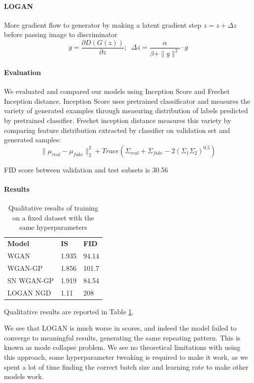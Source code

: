 \documentclass{article}
\begin{document}
	\paragraph {LOGAN} \cite{wu2020logan} More gradient flow to generator by making a latent gradient step $z = z + \Delta z$ before passing image to discriminator
	$$g = \frac{\partial D(G(z))}{\partial z}; \; \; \Delta z = \frac {\alpha} {\beta + \| g \|^2} \cdot g$$
	
	\paragraph{Evaluation}
	We evaluated and compared our models using Inception Score and Frechet Inception distance. Inception Score uses pretrained classificator and measures the variety of generated examples through measuring distribution of labels predicted by pretrained classifier. Frechet inception distance measures this variety by comparing feature distribution extracted by classifier on validation set and generated samples:
	$$\| \mu_{real} - \mu_{fake} \|_2^2 + Trace(\Sigma_{real} + \Sigma_{fake} - 2 (\Sigma_1 \Sigma_2)^{0.5})$$
	
	FID score between validation and test subsets is 30.56
	
	\paragraph{Results}
		\begin{table}[]
		\centering
		\begin{tabular}{lll}
			\textbf{Model} & \textbf{IS} & \textbf{FID} \\
			WGAN           & 1.935       & 94.14        \\
			WGAN-GP        & 1.856       & 101.7        \\
			SN WGAN-GP     & 1.919       & 84.54        \\
			LOGAN NGD      & 1.11        & 208         
		\end{tabular}
		\caption{Qualitative results of training on a fixed dataset with the same hyperparameters}
		\label{tab:res}
	\end{table}
	Qualitative results are reported in Table \ref{tab:res}. 
	
	We see that LOGAN is much worse in scores, and indeed the model failed to converge to meaningful results, generating the same repeating pattern. This is known as mode collapse problem. We see no theoretical limitations with using this approach, some hyperparameter tweaking is required to make it work, as we spent a lot of time finding the correct batch size and learning rate to make other models work.
	
\end{document}
